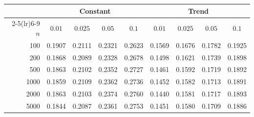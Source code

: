 \begin{tabular}{rcccccccc}
\toprule
& \multicolumn{4}{c}{Constant} & \multicolumn{4}{c}{Trend}\\
\cmidrule(lr){2-5}\cmidrule(lr){6-9}
$n$ & $0.01$ & $0.025$ & $0.05$ & $0.1$ & $0.01$ & $0.025$ & $0.05$ & $0.1$\\
\midrule
100 & 0.1907 & 0.2111 & 0.2321 & 0.2623 & 0.1569 & 0.1676 & 0.1782 & 0.1925 \\
200 & 0.1868 & 0.2089 & 0.2328 & 0.2678 & 0.1498 & 0.1621 & 0.1739 & 0.1898 \\
500 & 0.1863 & 0.2102 & 0.2352 & 0.2727 & 0.1461 & 0.1592 & 0.1719 & 0.1892 \\
1000 & 0.1859 & 0.2109 & 0.2362 & 0.2736 & 0.1452 & 0.1582 & 0.1713 & 0.1891 \\
2000 & 0.1863 & 0.2103 & 0.2374 & 0.2760 & 0.1440 & 0.1581 & 0.1717 & 0.1893 \\
5000 & 0.1844 & 0.2087 & 0.2361 & 0.2753 & 0.1451 & 0.1580 & 0.1709 & 0.1886 \\
\bottomrule
\end{tabular}
